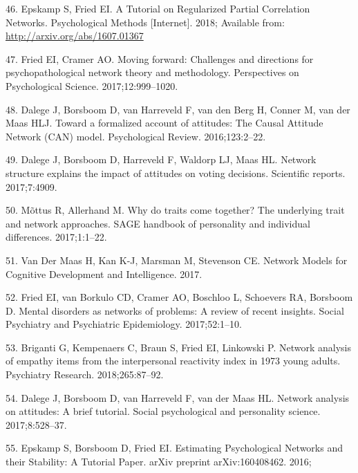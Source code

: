 \documentclass[english,man,floatsintext]{apa6}
\begin{document}
\leavevmode\hypertarget{ref-epskampTutorialRegularizedPartial2018}{}%
46. Epskamp S, Fried EI. A Tutorial on Regularized Partial Correlation Networks. Psychological Methods {[}Internet{]}. 2018; Available from: \url{http://arxiv.org/abs/1607.01367}

\leavevmode\hypertarget{ref-friedMovingForwardChallenges2017}{}%
47. Fried EI, Cramer AO. Moving forward: Challenges and directions for psychopathological network theory and methodology. Perspectives on Psychological Science. 2017;12:999--1020.

\leavevmode\hypertarget{ref-dalegeFormalizedAccountAttitudes2016}{}%
48. Dalege J, Borsboom D, van Harreveld F, van den Berg H, Conner M, van der Maas HLJ. Toward a formalized account of attitudes: The Causal Attitude Network (CAN) model. Psychological Review. 2016;123:2--22.

\leavevmode\hypertarget{ref-dalegeNetworkStructureExplains2017}{}%
49. Dalege J, Borsboom D, Harreveld F, Waldorp LJ, Maas HL. Network structure explains the impact of attitudes on voting decisions. Scientific reports. 2017;7:4909.

\leavevmode\hypertarget{ref-mottusWhyTraitsCome2017}{}%
50. Mõttus R, Allerhand M. Why do traits come together? The underlying trait and network approaches. SAGE handbook of personality and individual differences. 2017;1:1--22.

\leavevmode\hypertarget{ref-vandermaasNetworkModelsCognitive2017}{}%
51. Van Der Maas H, Kan K-J, Marsman M, Stevenson CE. Network Models for Cognitive Development and Intelligence. 2017.

\leavevmode\hypertarget{ref-friedMentalDisordersNetworks2017}{}%
52. Fried EI, van Borkulo CD, Cramer AO, Boschloo L, Schoevers RA, Borsboom D. Mental disorders as networks of problems: A review of recent insights. Social Psychiatry and Psychiatric Epidemiology. 2017;52:1--10.

\leavevmode\hypertarget{ref-brigantiNetworkAnalysisEmpathy2018}{}%
53. Briganti G, Kempenaers C, Braun S, Fried EI, Linkowski P. Network analysis of empathy items from the interpersonal reactivity index in 1973 young adults. Psychiatry Research. 2018;265:87--92.

\leavevmode\hypertarget{ref-dalegeNetworkAnalysisAttitudes2017}{}%
54. Dalege J, Borsboom D, van Harreveld F, van der Maas HL. Network analysis on attitudes: A brief tutorial. Social psychological and personality science. 2017;8:528--37.

\leavevmode\hypertarget{ref-epskampEstimatingPsychologicalNetworks2016}{}%
55. Epskamp S, Borsboom D, Fried EI. Estimating Psychological Networks and their Stability: A Tutorial Paper. arXiv preprint arXiv:160408462. 2016;
\end{document}
